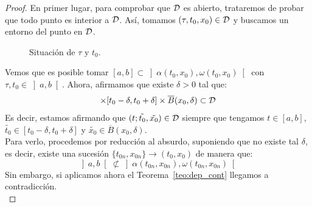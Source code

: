 \begin{proof} %
    En primer lugar, para comprobar que $\mathcal{D}$ es abierto, trataremos de probar que todo punto es interior a $\mathcal{D}$. Así, tomamos $(\tau,t_0,x_0)\in \mathcal{D}$ y buscamos un entorno del punto en $\mathcal{D}$. 

    \begin{figure}[H]
        \centering
        \caption{Situación de $\tau$ y $t_0$.}
        \label{fig:dem_global}
    \end{figure}
    \noindent
    Vemos que es posible tomar $[a,b]\subset \left]\alpha(t_0,x_0),\omega(t_0,x_0)\right[$ con $\tau,t_0\in \left]a,b\right[$. Ahora, afirmamos que existe $\delta>0$ tal que:
    \begin{equation*}
        [a,b] \times [t_0-\delta,t_0+\delta]\times \overline{B}(x_0,\delta) \subset \cc{D}
    \end{equation*}
    Es decir, estamos afirmando que $(t;\tilde{t_0},\tilde{x_0})\in \mathcal{D}$ siempre que tengamos $t\in [a,b]$, $\tilde{t_0}\in [t_0-\delta,t_0+\delta]$ y $\tilde{x_0}\in \overline{B}(x_0,\delta)$.\\

    \noindent
    Para verlo, procedemos por reducción al absurdo, suponiendo que no existe tal $\delta$, es decir, existe una sucesión $\{t_{0n}, x_{0n}\}\to (t_0,x_0)$ de manera que:
    \begin{equation*}
        \left]a,b\right[\not\subset \left]\alpha(t_{0n},x_{0n}),\omega(t_{0n},x_{0n})\right[
    \end{equation*}
    Sin embargo, si aplicamos ahora el Teorema~\ref{teo:dep_cont} llegamos a contradicción.\\


\end{proof}
